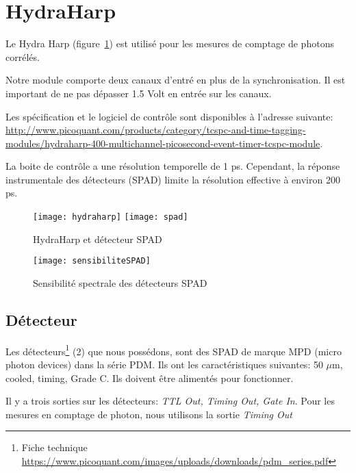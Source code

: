 \documentclass[11pt,francais]{book} %
\begin{document}

\section{HydraHarp}

Le Hydra Harp (figure~\ref{fig:hydraharp}) est utilisé pour les mesures de comptage de photons corrélés.

Notre module comporte deux canaux d'entré en plus de la synchronisation.
Il est important de ne pas dépasser 1.5 Volt en entrée sur les canaux.

Les spécification et le logiciel de contrôle sont disponibles à l'adresse suivante: \url{http://www.picoquant.com/products/category/tcspc-and-time-tagging-modules/hydraharp-400-multichannel-picosecond-event-timer-tcspc-module}.

La boite de contrôle a une résolution temporelle de 1 ps.
Cependant, la réponse instrumentale des détecteurs (SPAD) limite la résolution effective à environ 200 ps.

\begin{figure}[htbp]
  \centering\texttt{[image: hydraharp]}
  \centering\texttt{[image: spad]}
  \caption{HydraHarp et détecteur SPAD}
  \label{fig:hydraharp}
\end{figure}

\begin{figure}[htbp]
  \centering\texttt{[image: sensibiliteSPAD]}
  \caption{Sensibilité spectrale des détecteurs SPAD}
  \label{fig:spadSensibiliteSpectrale}
\end{figure}

\subsection{Détecteur} 

Les détecteurs\footnote{Fiche technique \url{https://www.picoquant.com/images/uploads/downloads/pdm_series.pdf}} (2) que nous possédons, sont des SPAD de marque MPD (micro photon devices) dans la série PDM.
Ils ont les caractéristiques suivantes: 50 $\mu$m, cooled, timing, Grade C. Ils doivent être alimentés pour fonctionner.

Il y a trois sorties sur les détecteurs: {\it TTL Out, Timing Out, Gate In}.
Pour les mesures en comptage de photon, nous utilisons la sortie {\it Timing Out}
\end{document}
